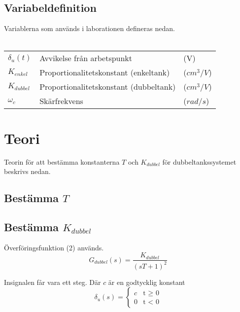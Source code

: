 \documentclass[a4paper]{article}
\begin{document}
\subsection{Variabeldefinition}

Variablerna som används i laborationen defineras nedan.
\\\\
\begin{tabular}{l l l}
  $\delta_{u}(t)$ & Avvikelse från arbetspunkt & (V) \\
  $K_{enkel}$ & Proportionalitetskonstant (enkeltank) & ($cm^3/V$) \\
  $K_{dubbel}$ & Proportionalitetskonstant (dubbeltank) & ($cm^3/V$) \\
  $\omega_c$ & Skärfrekvens & ($rad/s$)
\end{tabular}

\section{Teori}

Teorin för att bestämma konstanterna $T$ och $K_{dubbel}$ för dubbeltankssystemet beskrivs nedan. 

\subsection{Bestämma $T$}


\subsection{Bestämma $K_{dubbel}$}

Överföringsfunktion (2) används.
\\
\begin{equation}
  G_{dubbel}(s)=\frac{K_{dubbel}}{(sT+1)^2}
\end{equation}

Insignalen får vara ett steg. Där $c$ är en godtycklig konstant
\\
\begin{equation*}
\delta_{u}(s)=\begin{cases}
  c & \text{t $\geq$ 0}  \\
  0 & \text{t $<$ 0} 
\end{cases}
\end{equation*}
\\

\end{document}
